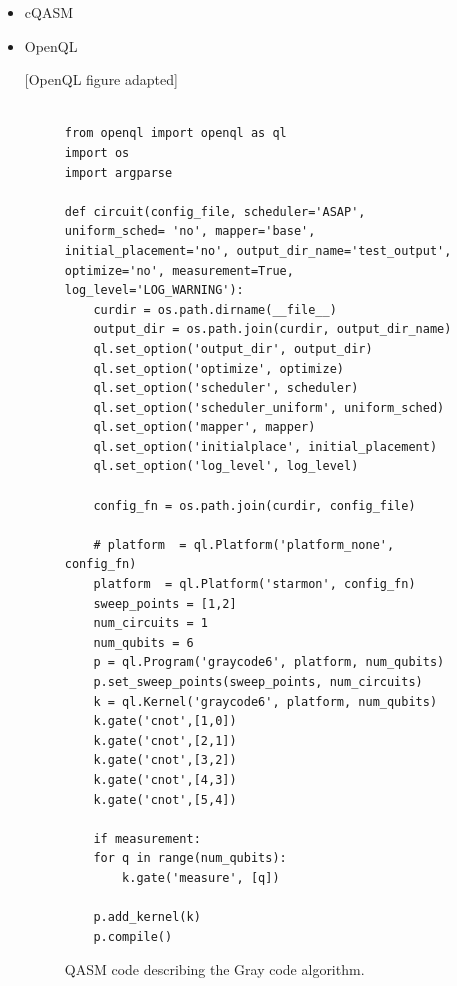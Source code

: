 \begin{itemize}
\item cQASM
\label{sec:orgbd78b76}


\item OpenQL
\label{sec:orge36aadd}

[OpenQL figure adapted]

\begin{figure}
\centering
\begin{minipage}{.45\textwidth}

\begin{verbatim}

from openql import openql as ql
import os
import argparse

def circuit(config_file, scheduler='ASAP', uniform_sched= 'no', mapper='base', initial_placement='no', output_dir_name='test_output', optimize='no', measurement=True, log_level='LOG_WARNING'):
    curdir = os.path.dirname(__file__)
    output_dir = os.path.join(curdir, output_dir_name)
    ql.set_option('output_dir', output_dir)
    ql.set_option('optimize', optimize)
    ql.set_option('scheduler', scheduler)
    ql.set_option('scheduler_uniform', uniform_sched)
    ql.set_option('mapper', mapper)
    ql.set_option('initialplace', initial_placement)
    ql.set_option('log_level', log_level)

    config_fn = os.path.join(curdir, config_file)

    # platform  = ql.Platform('platform_none', config_fn)
    platform  = ql.Platform('starmon', config_fn)
    sweep_points = [1,2]
    num_circuits = 1
    num_qubits = 6
    p = ql.Program('graycode6', platform, num_qubits)
    p.set_sweep_points(sweep_points, num_circuits)
    k = ql.Kernel('graycode6', platform, num_qubits)
    k.gate('cnot',[1,0])
    k.gate('cnot',[2,1])
    k.gate('cnot',[3,2])
    k.gate('cnot',[4,3])
    k.gate('cnot',[5,4])

    if measurement:
	for q in range(num_qubits):
	    k.gate('measure', [q])

    p.add_kernel(k)
    p.compile()

\end{verbatim}

\caption{QASM code describing the Gray code algorithm.}
\label{code:qasm_gray_code}
\end{minipage}
\end{figure}
\end{itemize}


